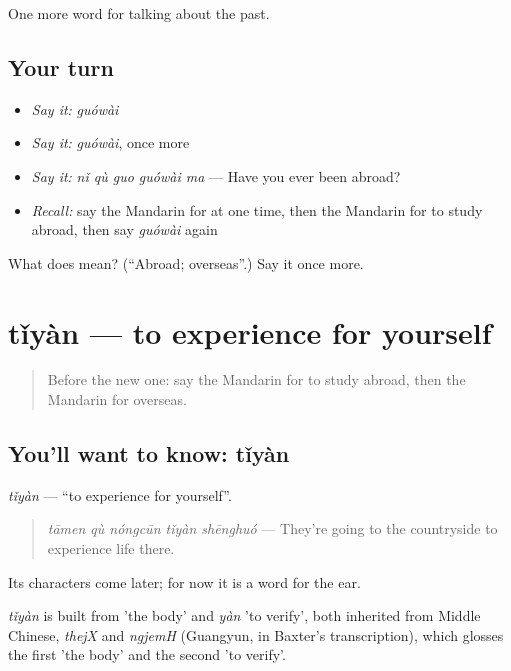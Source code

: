 \begin{grammarlens}[title={What you've built}]
One more word for talking about the past.
\end{grammarlens}

\subsection*{Your turn}
\begin{itemize}
\raggedright
  \item \emph{Say it:} \emph{guówài}
  \item \emph{Say it:} \emph{guówài}, once more
  \item \emph{Say it:} \emph{nǐ qù guo guówài ma} — Have you ever been abroad?
  \item \emph{Recall:} say the Mandarin for at one time, then the Mandarin for to study abroad, then say \emph{guówài} again
\end{itemize}

\begin{tcolorbox}[breakable,colback=teal!4,colframe=teal!35!black,title={Before you move on}]
What does  mean? (\textquotedblleft{}Abroad; overseas\textquotedblright{}.) Say it once more.
\end{tcolorbox}
\section[tǐyàn]{tǐyàn — to experience for yourself}

\label{lesson:ZH-C261-tiyan}



\begin{quote}
Before the new one: say the Mandarin for to study abroad, then the Mandarin for overseas.
\end{quote}

\subsection*{You'll want to know: tǐyàn}
\emph{tǐyàn} — \textquotedblleft{}to experience for yourself\textquotedblright{}.

\begin{quote}
\emph{tāmen qù nóngcūn tǐyàn shēnghuó} — They're going to the countryside to experience life there.
\end{quote}

Its characters come later; for now it is a word for the ear.

\begin{cousinweb}
\emph{tǐyàn} is built from  'the body' and \emph{yàn} 'to verify', both inherited from Middle Chinese, \emph{thejX} and \emph{ngjemH} (Guangyun, in Baxter's transcription), which glosses the first 'the body' and the second 'to verify'.
\end{cousinweb}

